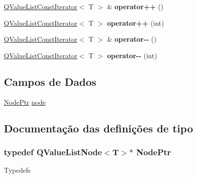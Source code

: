 \begin{DoxyCompactItemize}
\item 
\hypertarget{class_q_value_list_const_iterator_a3020dfd9cc2f264544ff48a06fea69e5}{\hyperlink{class_q_value_list_const_iterator}{Q\-Value\-List\-Const\-Iterator}$<$ T $>$ \& {\bfseries operator++} ()}\label{class_q_value_list_const_iterator_a3020dfd9cc2f264544ff48a06fea69e5}

\item 
\hypertarget{class_q_value_list_const_iterator_aa20f4a34d683d6530d50079980f745a0}{\hyperlink{class_q_value_list_const_iterator}{Q\-Value\-List\-Const\-Iterator}$<$ T $>$ {\bfseries operator++} (int)}\label{class_q_value_list_const_iterator_aa20f4a34d683d6530d50079980f745a0}

\item 
\hypertarget{class_q_value_list_const_iterator_a750ff3ef87c9dc45b9eaff03d171c09e}{\hyperlink{class_q_value_list_const_iterator}{Q\-Value\-List\-Const\-Iterator}$<$ T $>$ \& {\bfseries operator-\/-\/} ()}\label{class_q_value_list_const_iterator_a750ff3ef87c9dc45b9eaff03d171c09e}

\item 
\hypertarget{class_q_value_list_const_iterator_a4718c9803fe64b60e27cdd2718cefc79}{\hyperlink{class_q_value_list_const_iterator}{Q\-Value\-List\-Const\-Iterator}$<$ T $>$ {\bfseries operator-\/-\/} (int)}\label{class_q_value_list_const_iterator_a4718c9803fe64b60e27cdd2718cefc79}

\end{DoxyCompactItemize}
\subsection*{Campos de Dados}
\begin{DoxyCompactItemize}
\item 
\hyperlink{class_q_value_list_const_iterator_a33149bd41c7bb5c96791c9455305e769}{Node\-Ptr} \hyperlink{class_q_value_list_const_iterator_af543614539e0077318342ca740f88513}{node}
\end{DoxyCompactItemize}


\subsection{Documentação das definições de tipo}
\hypertarget{class_q_value_list_const_iterator_a33149bd41c7bb5c96791c9455305e769}{
\subsubsection[{Node\-Ptr}]{\setlength{\rightskip}{0pt plus 5cm}typedef {\bf Q\-Value\-List\-Node}$<$T$>$$\ast$ {\bf Node\-Ptr}}}\label{class_q_value_list_const_iterator_a33149bd41c7bb5c96791c9455305e769}
Typedefs 

